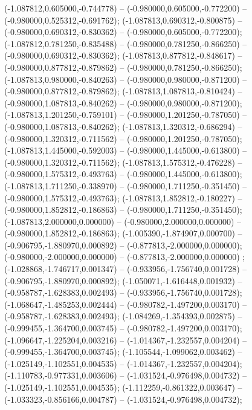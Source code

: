  (-1.087812,0.605000,-0.744778) -- (-0.980000,0.605000,-0.772200) -- (-0.980000,0.525312,-0.691762);
 (-1.087813,0.690312,-0.800875) -- (-0.980000,0.690312,-0.830362) -- (-0.980000,0.605000,-0.772200);
 (-1.087812,0.781250,-0.835488) -- (-0.980000,0.781250,-0.866250) -- (-0.980000,0.690312,-0.830362);
 (-1.087813,0.877812,-0.848617) -- (-0.980000,0.877812,-0.879862) -- (-0.980000,0.781250,-0.866250);
 (-1.087813,0.980000,-0.840263) -- (-0.980000,0.980000,-0.871200) -- (-0.980000,0.877812,-0.879862);
 (-1.087813,1.087813,-0.810424) -- (-0.980000,1.087813,-0.840262) -- (-0.980000,0.980000,-0.871200);
 (-1.087813,1.201250,-0.759101) -- (-0.980000,1.201250,-0.787050) -- (-0.980000,1.087813,-0.840262);
 (-1.087813,1.320312,-0.686294) -- (-0.980000,1.320312,-0.711562) -- (-0.980000,1.201250,-0.787050);
 (-1.087813,1.445000,-0.592003) -- (-0.980000,1.445000,-0.613800) -- (-0.980000,1.320312,-0.711562);
 (-1.087813,1.575312,-0.476228) -- (-0.980000,1.575312,-0.493763) -- (-0.980000,1.445000,-0.613800);
 (-1.087813,1.711250,-0.338970) -- (-0.980000,1.711250,-0.351450) -- (-0.980000,1.575312,-0.493763);
 (-1.087813,1.852812,-0.180227) -- (-0.980000,1.852812,-0.186863) -- (-0.980000,1.711250,-0.351450);
 (-1.087813,2.000000,0.000000) -- (-0.980000,2.000000,0.000000) -- (-0.980000,1.852812,-0.186863);
 (-1.005390,-1.874907,0.000700) -- (-0.906795,-1.880970,0.000892) -- (-0.877813,-2.000000,0.000000);
 (-0.980000,-2.000000,0.000000) -- (-0.877813,-2.000000,0.000000) ;
 (-1.028868,-1.746717,0.001347) -- (-0.933956,-1.756740,0.001728) -- (-0.906795,-1.880970,0.000892);
 (-1.050071,-1.616448,0.001932) -- (-0.958787,-1.628383,0.002493) -- (-0.933956,-1.756740,0.001728);
 (-1.068647,-1.485253,0.002444) -- (-0.980782,-1.497200,0.003170) -- (-0.958787,-1.628383,0.002493);
 (-1.084269,-1.354393,0.002875) -- (-0.999455,-1.364700,0.003745) -- (-0.980782,-1.497200,0.003170);
 (-1.096647,-1.225204,0.003216) -- (-1.014367,-1.232557,0.004204) -- (-0.999455,-1.364700,0.003745);
 (-1.105544,-1.099062,0.003462) -- (-1.025149,-1.102551,0.004535) -- (-1.014367,-1.232557,0.004204);
 (-1.110783,-0.977331,0.003606) -- (-1.031524,-0.976498,0.004732) -- (-1.025149,-1.102551,0.004535);
 (-1.112259,-0.861322,0.003647) -- (-1.033323,-0.856166,0.004787) -- (-1.031524,-0.976498,0.004732);
